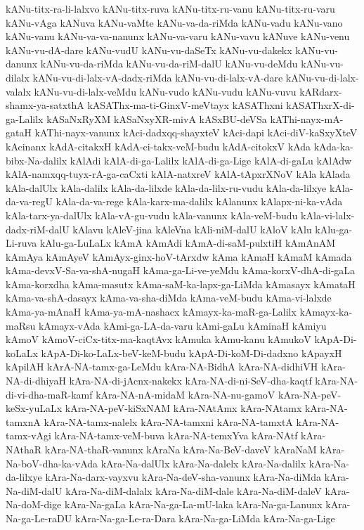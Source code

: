 {kANu-titx-ra-li-lalxvo
kANu-titx-ruva
kANu-titx-ru-vanu
kANu-titx-ru-varu
kANu-vAga
kANuva
kANu-vaMte
kANu-va-da-riMda
kANu-vadu
kANu-vano
kANu-vanu
kANu-va-va-nanunx
kANu-va-varu
kANu-vavu
kANuve
kANu-venu
kANu-vu-dA-dare
kANu-vudU
kANu-vu-daSeTx
kANu-vu-dakekx
kANu-vu-danunx
kANu-vu-da-riMda
kANu-vu-da-riM-dalU
kANu-vu-deMdu
kANu-vu-dilalx
kANu-vu-di-lalx-vA-dadx-riMda
kANu-vu-di-lalx-vA-dare
kANu-vu-di-lalx-valalx
kANu-vu-di-lalx-veMdu
kANu-vudo
kANu-vudu
kANu-vuvu
kARdarx-shamx-ya-satxthA
kASAThx-ma-ti-GinxV-meVtayx
kASAThxni
kASAThxrX-di-ga-Lalilx
kASaNxRyXM
kASaNxyXR-mivA
kASxBU-deVSa
kAThi-nayx-mA-gataH
kAThi-nayx-vanunx
kAci-dadxqq-shayxteV
kAci-dapi
kAci-diV-kaSxyXteV
kAcinanx
kAdA-citakxH
kAdA-ci-takx-veM-budu
kAdA-citokxV
kAda
kAda-ka-bibx-Na-dalilx
kAlAdi
kAlA-di-ga-Lalilx
kAlA-di-ga-Lige
kAlA-di-gaLu
kAlAdw
kAlA-namxqq-tuyx-rA-ga-caCxti
kAlA-natxreV
kAlA-tApxrXNoV
kAla
kAlada
kAla-dalUlx
kAla-dalilx
kAla-da-lilxde
kAla-da-lilx-ru-vudu
kAla-da-lilxye
kAla-da-va-regU
kAla-da-va-rege
kAla-karx-ma-dalilx
kAlanunx
kAlapx-ni-ka-vAda
kAla-tarx-ya-dalUlx
kAla-vA-gu-vudu
kAla-vanunx
kAla-veM-budu
kAla-vi-lalx-dadx-riM-dalU
kAlavu
kAleV-jina
kAleVna
kAli-niM-dalU
kAloV
kAlu
kAlu-ga-Li-ruva
kAlu-ga-LuLaLx
kAmA
kAmAdi
kAmA-di-saM-pulxtiH
kAmAnAM
kAmAya
kAmAyeV
kAmAyx-ginx-hoV-tArxdw
kAma
kAmaH
kAmaM
kAmada
kAma-devxV-Sa-va-shA-nugaH
kAma-ga-Li-ve-yeMdu
kAma-korxV-dhA-di-gaLa
kAma-korxdha
kAma-masutx
kAma-saM-ka-lapx-ga-LiMda
kAmasayx
kAmataH
kAma-va-shA-dasayx
kAma-va-sha-diMda
kAma-veM-budu
kAma-vi-lalxde
kAma-ya-mAnaH
kAma-ya-mA-nashacx
kAmayx-ka-maR-ga-Lalilx
kAmayx-ka-maRsu
kAmayx-vAda
kAmi-ga-LA-da-varu
kAmi-gaLu
kAminaH
kAmiyu
kAmoV
kAmoV-ciCx-titx-ma-kaqtAvx
kAmuka
kAmu-kanu
kAmukoV
kApA-Di-koLaLx
kApA-Di-ko-LaLx-beV-keM-budu
kApA-Di-koM-Di-dadxno
kApayxH
kApilAH
kArA-NA-tamx-ga-LeMdu
kAra-NA-BidhA
kAra-NA-didhiVH
kAra-NA-di-dhiyaH
kAra-NA-di-jAcnx-nakekx
kAra-NA-di-ni-SeV-dha-kaqtf
kAra-NA-di-vi-dha-maR-kamf
kAra-NA-nA-midaM
kAra-NA-nu-gamoV
kAra-NA-peV-keSx-yuLaLx
kAra-NA-peV-kiSxNAM
kAra-NAtAmx
kAra-NAtamx
kAra-NA-tamxnA
kAra-NA-tamx-nalelx
kAra-NA-tamxni
kAra-NA-tamxtA
kAra-NA-tamx-vAgi
kAra-NA-tamx-veM-buva
kAra-NA-temxYva
kAra-NAtf
kAra-NAthaR
kAra-NA-thaR-vanunx
kAraNa
kAra-Na-BeV-daveV
kAraNaM
kAra-Na-boV-dha-ka-vAda
kAra-Na-dalUlx
kAra-Na-dalelx
kAra-Na-dalilx
kAra-Na-da-lilxye
kAra-Na-darx-vayxvu
kAra-Na-deV-sha-vanunx
kAra-Na-diMda
kAra-Na-diM-dalU
kAra-Na-diM-dalalx
kAra-Na-diM-dale
kAra-Na-diM-daleV
kAra-Na-doM-dige
kAra-Na-gaLa
kAra-Na-ga-La-mU-laka
kAra-Na-ga-Lanunx
kAra-Na-ga-Le-raDU
kAra-Na-ga-Le-ra-Dara
kAra-Na-ga-LiMda
kAra-Na-ga-Lige
}
